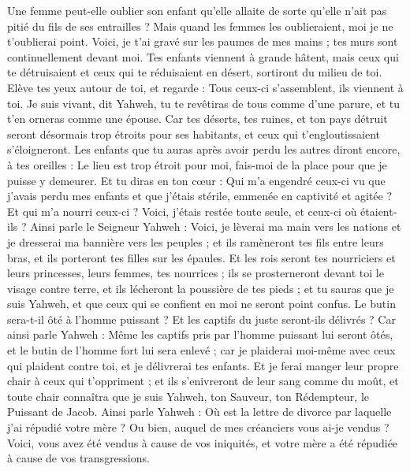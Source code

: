 \begin{multicols}{2}
Une femme peut-elle oublier son enfant qu'elle allaite de sorte qu'elle n'ait pas pitié du fils de ses entrailles ? Mais quand les femmes les oublieraient, moi je ne t'oublierai point.
Voici, je t'ai gravé sur les paumes de mes mains ; tes murs sont continuellement devant moi.
Tes enfants viennent à grande hâtent, mais ceux qui te détruisaient et ceux qui te réduisaient en désert, sortiront du milieu de toi.
Elève tes yeux autour de toi, et regarde : Tous ceux-ci s'assemblent, ils viennent à toi. Je suis vivant, dit Yahweh, tu te revêtiras de tous comme d'une parure, et tu t'en orneras comme une épouse.
Car tes déserts, tes ruines, et ton pays détruit seront désormais trop étroits pour ses habitants, et ceux qui t'engloutissaient s'éloigneront.
Les enfants que tu auras après avoir perdu les autres diront encore, à tes oreilles : Le lieu est trop étroit pour moi, fais-moi de la place pour que je puisse y demeurer.
Et tu diras en ton cœur : Qui m'a engendré ceux-ci vu que j'avais perdu mes enfants et que j'étais stérile, emmenée en captivité et agitée ? Et qui m'a nourri ceux-ci ? Voici, j'étais restée toute seule, et ceux-ci où étaient-ils ?
Ainsi parle le Seigneur Yahweh : Voici, je lèverai ma main vers les nations et je dresserai ma bannière vers les peuples ; et ils ramèneront tes fils entre leurs bras, et ils porteront tes filles sur les épaules.
Et les rois seront tes nourriciers et leurs princesses, leurs femmes, tes nourrices ; ils se prosterneront devant toi le visage contre terre, et ils lécheront la poussière de tes pieds ; et tu sauras que je suis Yahweh, et que ceux qui se confient en moi ne seront point confus.
Le butin sera-t-il ôté à l'homme puissant ? Et les captifs du juste seront-ils délivrés ?
Car ainsi parle Yahweh : Même les captifs pris par l'homme puissant lui seront ôtés, et le butin de l'homme fort lui sera enlevé ; car je plaiderai moi-même avec ceux qui plaident contre toi, et je délivrerai tes enfants.
Et je ferai manger leur propre chair à ceux qui t'oppriment ; et ils s'enivreront de leur sang comme du moût, et toute chair connaîtra que je suis Yahweh, ton Sauveur, ton Rédempteur, le Puissant de Jacob.
\VerseOne{}Ainsi parle Yahweh : Où est la lettre de divorce par laquelle j'ai répudié votre mère ? Ou bien, auquel de mes créanciers vous ai-je vendus ? Voici, vous avez été vendus à cause de vos iniquités, et votre mère a été répudiée à cause de vos transgressions.

\end{multicols}
